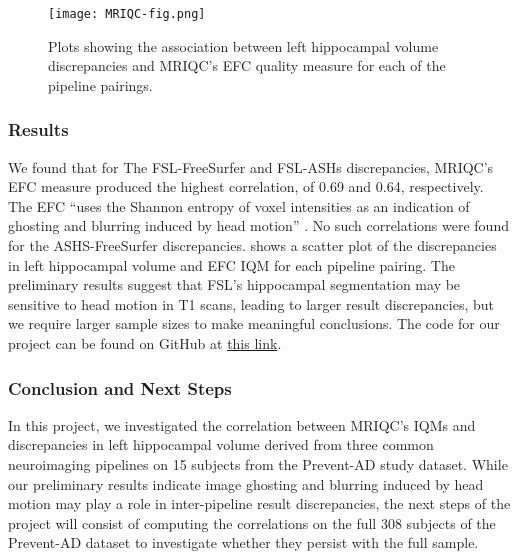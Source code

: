 \documentclass[../main.tex]{subfiles}
\begin{document}
\begin{figure}[!h]
	\centering
	\texttt{[image: MRIQC-fig.png]}
	\caption{Plots showing the association between left hippocampal volume discrepancies and MRIQC’s EFC quality measure for each of the pipeline pairings.}
	\label{fig:MRIQC-fig}
\end{figure}

\subsubsection{Results}

We found that for The FSL-FreeSurfer and FSL-ASHs discrepancies, MRIQC’s EFC measure produced the highest correlation, of 0.69 and 0.64, respectively. The EFC “uses the Shannon entropy of voxel intensities as an indication of ghosting and blurring induced by head motion” \parencite{MRIQCdoc}. No such correlations were found for the ASHS-FreeSurfer discrepancies.  shows a scatter plot of the discrepancies in left hippocampal volume and EFC IQM for each pipeline pairing. The preliminary results suggest that FSL’s hippocampal segmentation may be sensitive to head motion in T1 scans, leading to larger result discrepancies, but we require larger sample sizes to make meaningful conclusions. The code for our project can be found on GitHub at \href{https://github.com/jacobsanz97/Pipeline-Discrepancy-Exploration}{this link}. 

\subsubsection{Conclusion and Next Steps}

In this project, we investigated the correlation between MRIQC’s IQMs and discrepancies in left hippocampal volume derived from three common neuroimaging pipelines on 15 subjects from the Prevent-AD study dataset. While our preliminary results indicate image ghosting and blurring induced by head motion may play a role in inter-pipeline result discrepancies, the next steps of the project will consist of computing the correlations on the full 308 subjects of the Prevent-AD dataset to investigate whether they persist with the full sample.
\end{document}
